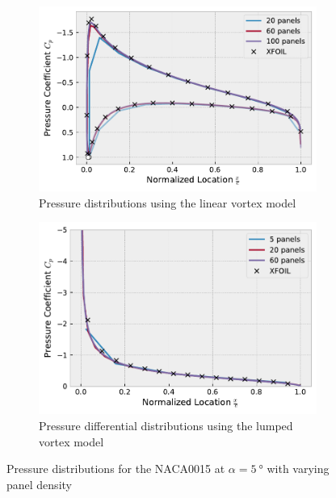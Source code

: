 \begin{figure}[h]
  \centering
  \begin{subfigure}{.5\textwidth}
    \centering
    \captionsetup{width=.8\linewidth}
    \includegraphics[width=.9\linewidth]{static/thick_panels.pdf}
    \caption{\centering Pressure distributions using the linear vortex model}
    \label{fig:thick_npanels}
  \end{subfigure}\hfill%
  \begin{subfigure}{.5\textwidth}
    \centering
    \captionsetup{width=.8\linewidth}
    \includegraphics[width=.9\linewidth]{static/thin_panels.pdf}
    \caption{\centering  Pressure differential distributions using the lumped vortex model}
    \label{fig:thin_npanels}
  \end{subfigure}
  \caption{\centering Pressure distributions for the NACA0015 at
  $\alpha=\SI{5}{\degree}$ with varying panel density}
  \label{fig:npanels}
\end{figure}

